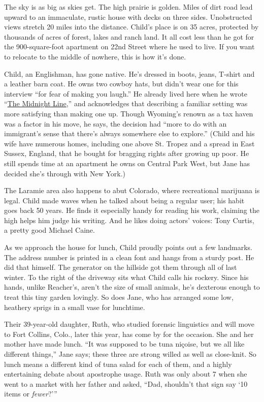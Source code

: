 The sky is as big as skies get. The high prairie is golden. Miles of
dirt road lead upward to an immaculate, rustic house with decks on three
sides. Unobstructed views stretch 20 miles into the distance. Child's
place is on 35 acres, protected by thousands of acres of forest, lakes
and ranch land. It all cost less than he got for the 900-square-foot
apartment on 22nd Street where he used to live. If you want to relocate
to the middle of nowhere, this is how it's done.

Child, an Englishman, has gone native. He's dressed in boots, jeans,
T-shirt and a leather barn coat. He owns two cowboy hats, but didn't
wear one for this interview ``for fear of making you laugh.'' He already
lived here when he wrote
``\href{https://www.nytimes.com/2017/11/08/books/review-midnight-line-jack-reacher-lee-child.html}{The
Midnight Line},'' and acknowledges that describing a familiar setting
was more satisfying than making one up. Though Wyoming's renown as a tax
haven was a factor in his move, he says, the decision had ``more to do
with an immigrant's sense that there's always somewhere else to
explore.'' (Child and his wife have numerous homes, including one above
St. Tropez and a spread in East Sussex, England, that he bought for
bragging rights after growing up poor. He still spends time at an
apartment he owns on Central Park West, but Jane has decided she's
through with New York.)

The Laramie area also happens to abut Colorado, where recreational
marijuana is legal. Child made waves when he talked about being a
regular user; his habit goes back 50 years. He finds it especially handy
for reading his work, claiming the high helps him judge his writing. And
he likes doing actors' voices: Tony Curtis, a pretty good Michael Caine.

As we approach the house for lunch, Child proudly points out a few
landmarks. The address number is printed in a clean font and hangs from
a sturdy post. He did that himself. The generator on the hillside got
them through all of last winter. To the right of the driveway sits what
Child calls his rockery. Since his hands, unlike Reacher's, aren't the
size of small animals, he's dexterous enough to treat this tiny garden
lovingly. So does Jane, who has arranged some low, heathery sprigs in a
small vase for lunchtime.

Their 39-year-old daughter, Ruth, who studied forensic linguistics and
will move to Fort Collins, Colo., later this year, has come by for the
occasion. She and her mother have made lunch. ``It was supposed to be
tuna niçoise, but we all like different things,'' Jane says; these three
are strong willed as well as close-knit. So lunch means a different kind
of tuna salad for each of them, and a highly entertaining debate about
apostrophe usage. Ruth was only about 7 when she went to a market with
her father and asked, ``Dad, shouldn't that sign say `10 items or
\emph{fewer}?'''

